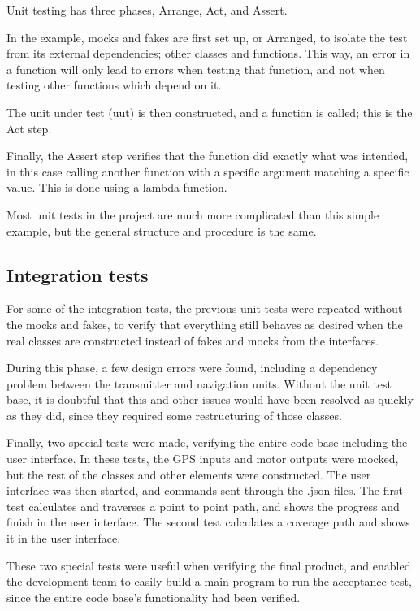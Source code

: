 Unit testing has three phases, Arrange, Act, and Assert. 

In the example, mocks and fakes are first set up, or Arranged, to isolate the test from its external dependencies; other classes and functions. This way, an error in a function will only lead to errors when testing that function, and not when testing other functions which depend on it. 

The unit under test (uut) is then constructed, and a function is called; this is the Act step. 

Finally, the Assert step verifies that the function did exactly what was intended, in this case calling another function with a specific argument matching a specific value. This is done using a lambda function.

Most unit tests in the project are much more complicated than this simple example, but the general structure and procedure is the same. 

\subsection{Integration tests}

For some of the integration tests, the previous unit tests were repeated without the mocks and fakes, to verify that everything still behaves as desired when the real classes are constructed instead of fakes and mocks from the interfaces.

During this phase, a few design errors were found, including a dependency problem between the transmitter and navigation units. Without the unit test base, it is doubtful that this and other issues would have been resolved as quickly as they did, since they required some restructuring of those classes. 

Finally, two special tests were made, verifying the entire code base including the user interface. In these tests, the GPS inputs and motor outputs were mocked, but the rest of the classes and other elements were constructed. The user interface was then started, and commands sent through the .json files. The first test calculates and traverses a point to point path, and shows the progress and finish in the user interface. The second test calculates a coverage path and shows it in the user interface.

These two special tests were useful when verifying the final product, and enabled the development team to easily build a main program to run the acceptance test, since the entire code base's functionality had been verified.

